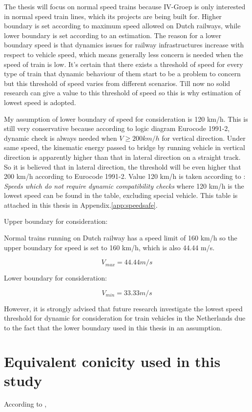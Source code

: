 The thesis will focus on normal speed trains because IV-Groep is only interested in normal speed train lines, which its projects are being built for. Higher boundary is set according to maximum speed allowed on Dutch railways, while lower boundary is set according to an estimation. The reason for a lower boundary speed is that dynamics issues for railway infrastructures increase with respect to vehicle speed, which means generally less concern is needed when the speed of train is low. It's certain that there exists a threshold of speed for every type of train that dynamic behaviour of them start to be a problem to concern but this threshold of speed varies from different scenarios. Till now no solid research can give a value to this threshold of speed so this is why estimation of lowest speed is adopted. 

My assumption of lower boundary of speed for consideration is 120 km/h. This is still very conservative because according to logic diagram Eurocode 1991-2\cite{EC12}, dynamic check is always needed when $V \geq 200km/h$ for vertical direction. Under same speed, the kinematic energy passed to bridge by running vehicle in vertical direction is apparently higher than that in lateral direction on a straight track. So it is believed that in lateral direction, the threshold will be even higher that 200 km/h according to Eurocode 1991-2. Value 120 km/h is taken according to \cite[Appendix F]{EC15528}: \textit{Speeds which do not require dynamic compatibility checks} where 120 km/h is the lowest speed can be found in the table, excluding special vehicle. This table is attached in this thesis in Appendix.\ref{app:speedsafe}.

Upper boundary for consideration:

Normal trains running on Dutch railway has a speed limit of 160 km/h so the upper boundary for speed is set to 160 km/h, which is also 44.44 m/s. 

$$ V_{max} = 44.44m/s $$

Lower boundary for consideration:

$$ V_{min} = 33.33m/s $$

However, it is strongly advised that future research investigate the lowest speed threshold for dynamic for consideration for train vehicles in the Netherlands due to the fact that the lower boundary used in this thesis in an assumption.

\section{Equivalent conicity used in this study}
According to \cite[Section.2.6]{esveld2001modern}, 

